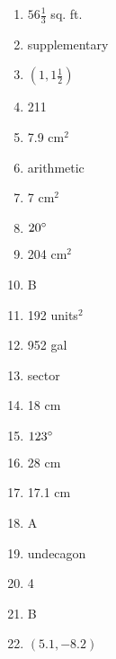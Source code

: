 \documentclass[../uilmath.tex]{subfiles}
\begin{document}
\begin{enumerate}[label=\bfseries\arabic*.]
    \item %
    $56\frac{1}{3}$ sq. ft. 

    \item %
    supplementary

    \item %
    $(1,1\frac{1}{2})$

    \item %
    211

    \item %
    7.9 cm$^2$

    \item %
    arithmetic

    \item %
    7 cm$^2$

    \item %
    $20\degree$

    \item %
    204 cm$^2$

    \item %
    B 

    \item %
    192 units$^2$

    \item %
    952 gal 

    \item %
    sector 

    \item %
    18 cm

    \item %
    $123\degree$

    \item %
    28 cm 

    \item %
    17.1 cm 

    \item %
    A 

    \item %
    undecagon 

    \item %
    4

    \item %
    B 

    \item %
    $(5.1,-8.2)$


\end{enumerate}
\end{document}
